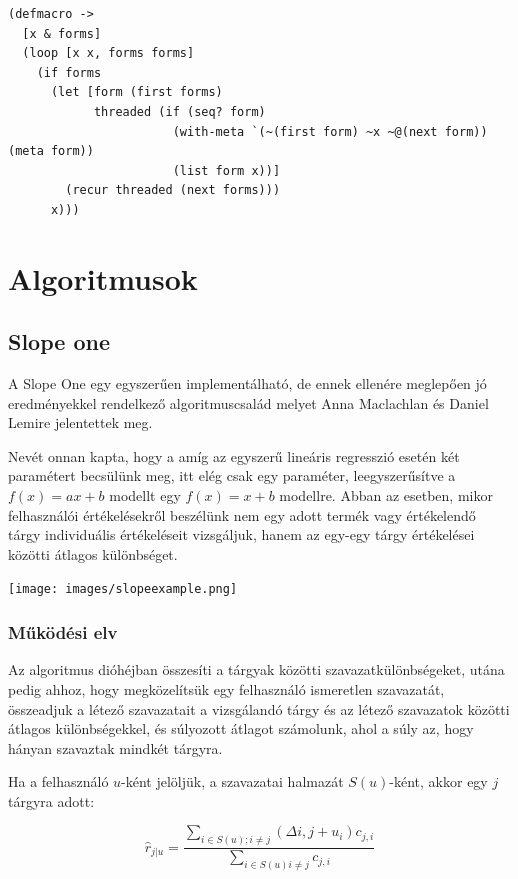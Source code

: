 \documentclass[final, 12pt] {ubb_dolgozat}{book}
\begin{document}
\begin{verbatim}
(defmacro ->
  [x & forms]
  (loop [x x, forms forms]
    (if forms
      (let [form (first forms)
            threaded (if (seq? form)
                       (with-meta `(~(first form) ~x ~@(next form)) (meta form))
                       (list form x))]
        (recur threaded (next forms)))
      x)))
\end{verbatim}
\chapter{Algoritmusok}
\label{sec:org07732a4}
\section{Slope one}
\label{sec:orge5ab5e1}
A Slope One egy egyszerűen implementálható, de ennek ellenére meglepően jó eredményekkel
rendelkező algoritmuscsalád melyet Anna Maclachlan és Daniel Lemire jelentettek meg.
\citep{lemireSlopeOnePredictors2008}

Nevét onnan kapta, hogy a amíg az egyszerű lineáris regresszió esetén két paramétert becsülünk meg,
itt elég csak egy paraméter, leegyszerűsítve a \(f(x) = ax + b\) modellt egy \(f(x) = x + b\) modellre. Abban az esetben, mikor
felhasználói értékelésekről beszélünk nem egy adott termék vagy értékelendő tárgy individuális értékeléseit vizsgáljuk,
hanem az egy-egy tárgy értékelései közötti átlagos különbséget.

\begin{center}
\texttt{[image: images/slopeexample.png]}
\end{center}


\subsection{Működési elv}
\label{sec:org79f1292}
Az algoritmus dióhéjban összesíti a tárgyak közötti szavazatkülönbségeket,
utána pedig ahhoz, hogy megközelítsük egy felhasználó ismeretlen szavazatát, összeadjuk a
létező szavazatait a vizsgálandó tárgy és az létező szavazatok közötti átlagos különbségekkel,
és súlyozott átlagot számolunk, ahol a súly az, hogy hányan szavaztak mindkét tárgyra.

Ha a felhasználó \(u\)-ként jelöljük, a szavazatai halmazát \(S(u)\)-ként, akkor egy \(j\) tárgyra
adott:

\begin{equation}
\hat{r}_{j|u} = \frac{\sum_{i \in S(u); i \not= j}{(\Delta{i,j} + u_{i})c_{j,i}}}{\sum_{i \in S(u) i \not= j} c_{j,i}}
\end{equation}
\end{document}
